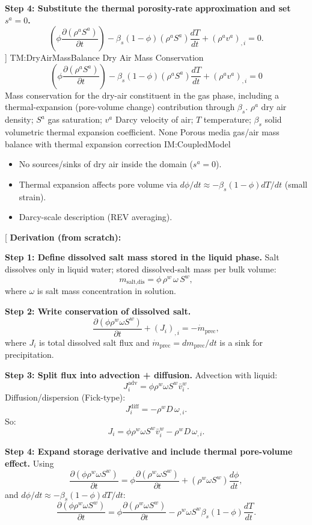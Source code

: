 \documentclass[12pt]{article}
\newcommand{\deftheory}[9][Not Applicable]
{
\newpage
\noindent \rule{\textwidth}{0.5mm}

\paragraph{RefName: } \textbf{#2} \phantomsection
\label{#2}

\paragraph{Label:} #3

\noindent \rule{\textwidth}{0.5mm}

\paragraph{Equation:}
#4

\paragraph{Description:}
#5

\paragraph{Notes:}
#6

\paragraph{Source:}
#7

\paragraph{Ref.\ By:}
#8

\paragraph{Preconditions for \hyperref[#2]{#2}:}
\label{#2_precond}
#9

\paragraph{Derivation for \hyperref[#2]{#2}:}
\label{#2_deriv}
#1

\noindent \rule{\textwidth}{0.5mm}
}
\begin{document}
\textbf{Step 4: Substitute the thermal porosity-rate approximation and set $s^a=0$.}
\[
\left(\phi\frac{\partial(\rho^a S^a)}{\partial t}\right)
-\beta_s(1-\phi)\left(\rho^a S^a\right)\frac{dT}{dt}
+(\rho^a v^a)_{,i}=0.
\]
]
{TM:DryAirMassBalance}
{Dry Air Mass Conservation}
{
\[
\left(\phi\frac{\partial\left(\rho^{a}S^{a}\right)}{\partial t}\right)
-\beta_{s}(1-\phi)\left(\rho^{a}S^{a}\right)\frac{dT}{dt}
+\left(\rho^{a}v^{a}\right)_{,i}=0
\]
}
{
Mass conservation for the dry-air constituent in the gas phase, including a thermal-expansion (pore-volume change) contribution through $\beta_s$.
}
{
$\rho^a$ dry air density; $S^a$ gas saturation; $v^a$ Darcy velocity of air; $T$ temperature; $\beta_s$ solid volumetric thermal expansion coefficient.
}
{None}
{Porous media gas/air mass balance with thermal expansion correction}
{IM:CoupledModel}
{
\begin{itemize}
\item No sources/sinks of dry air inside the domain ($s^a=0$).
\item Thermal expansion affects pore volume via $d\phi/dt \approx -\beta_s(1-\phi)dT/dt$ (small strain).
\item Darcy-scale description (REV averaging).
\end{itemize}
}
{}

\noindent
{}[
\textbf{Derivation (from scratch):}

\textbf{Step 1: Define dissolved salt mass stored in the liquid phase.}
Salt dissolves only in liquid water; stored dissolved-salt mass per bulk volume:
\[
m_{\text{salt,dis}} = \phi\,\rho^w\,\omega\,S^w,
\]
where $\omega$ is salt mass concentration in solution.

\textbf{Step 2: Write conservation of dissolved salt.}
\[
\frac{\partial(\phi\rho^w\omega S^w)}{\partial t} + (J_i)_{,i} = -\dot{m}_{\text{prec}},
\]
where $J_i$ is total dissolved salt flux and $\dot{m}_{\text{prec}}=dm_{\text{prec}}/dt$ is a sink for precipitation.

\textbf{Step 3: Split flux into advection + diffusion.}
Advection with liquid:
\[
J_i^{\text{adv}} = \phi\rho^w\omega S^w \bar{v}_i^w.
\]
Diffusion/dispersion (Fick-type):
\[
J_i^{\text{diff}} = -\rho^w D\,\omega_{,i}.
\]
So:
\[
J_i = \phi\rho^w\omega S^w \bar{v}_i^w - \rho^w D\,\omega_{,i}.
\]

\textbf{Step 4: Expand storage derivative and include thermal pore-volume effect.}
Using
\[
\frac{\partial(\phi\rho^w\omega S^w)}{\partial t}
= \phi\frac{\partial(\rho^w\omega S^w)}{\partial t} + (\rho^w\omega S^w)\frac{d\phi}{dt},
\]
and $d\phi/dt \approx -\beta_s(1-\phi)dT/dt$:
\[
\frac{\partial(\phi\rho^w\omega S^w)}{\partial t}
= \phi\frac{\partial(\rho^w\omega S^w)}{\partial t}
-\rho^w\omega S^w\beta_s(1-\phi)\frac{dT}{dt}.
\]
\end{document}
